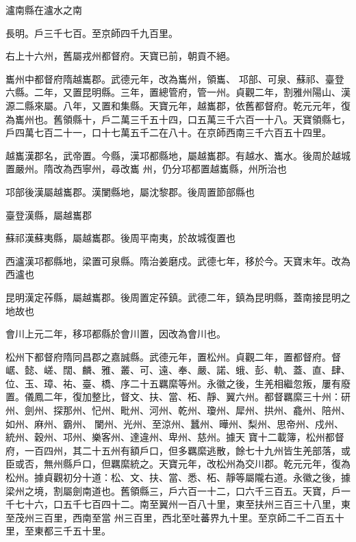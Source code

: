 \begin{pinyinscope}
 瀘南縣在瀘水之南



 長明。戶三千七百。至京師四千九百里。



 右上十六州，舊屬戎州都督府。天寶已前，朝貢不絕。



 巂州中都督府隋越巂郡。武德元年，改為巂州，領巂、
 邛部、可泉、蘇祁、臺登六縣。二年，又置昆明縣。三年，置總管府，管一州。貞觀二年，割雅州陽山、漢源二縣來屬。八年，又置和集縣。天寶元年，越巂郡，依舊都督府。乾元元年，復為巂州也。舊領縣十，戶二萬三千五十四，口五萬三千六百一十八。天寶領縣七，戶四萬七百二十一，口十七萬五千二在八十。在京師西南三千六百五十四里。



 越巂漢郡名，武帝置。今縣，漢邛都縣地，屬越巂郡。有越水、巂水。後周於越城置嚴州。隋改為西寧州，尋改巂
 州，仍分邛都置越巂縣，州所治也



 邛部後漢屬越巂郡。漢闌縣地，屬沈黎郡。後周置節部縣也



 臺登漢縣，屬越巂郡



 蘇祁漢蘇夷縣，屬越巂郡。後周平南夷，於故城復置也



 西瀘漢邛都縣地，梁置可泉縣。隋治姜磨戍。武德七年，移於今。天寶末年。改為西瀘也



 昆明漢定莋縣，屬越巂郡。後周置定莋鎮。武德二年，鎮為昆明縣，蓋南接昆明之地故也



 會川上元二年，移邛都縣於會川置，因改為會川也。



 松州下都督府隋同昌郡之嘉誠縣。武德元年，置松州。貞觀二年，置都督府。督崌、懿、嵯、闊、麟、雅、叢、可、遠、奉、嚴、諾、蛾、彭、軌、蓋、直、肆、位、玉、璋、祐、臺、橋、序二十五羈縻等州。永徽之後，生羌相繼忽叛，屢有廢置。儀鳳二年，復加整比，督文、扶、當、柘、靜、翼六州。都督羈縻三十州：研州、劍州、探那州、忋州、毗州、河州、乾州、瓊州、犀州、拱州、龕州、陪州、如州、麻州、霸州、闌州、光州、至涼州、蠶州、曄州、梨州、思帝州、戍州、統州、穀州、邛州、樂客州、達違州、卑州、慈州。據天
 寶十二載簿，松州都督府，一百四州，其二十五州有額戶口，但多羈縻逃散，餘七十九州皆生羌部落，或臣或否，無州縣戶口，但羈縻統之。天寶元年，改松州為交川郡。乾元元年，復為松州。據貞觀初分十道：松、文、扶、當、悉、柘、靜等屬隴右道。永徽之後，據梁州之境，割屬劍南道也。舊領縣三，戶六百一十二，口六千三百五。天寶，戶一千七十六，口五千七百四十二。南至翼州一百八十里，東至扶州三百三十八里，東至茂州三百里，西南至當
 州三百里，西北至吐蕃界九十里。至京師二千二百五十里，至東都三千五十里。




\end{pinyinscope}
